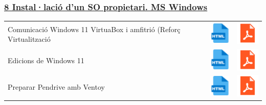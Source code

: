 \documentclass[
  12 pt,
  a4paper,
]{article}
\begin{document}
\subsubsection{\texorpdfstring{\hyperref[U8]{8 Instal·lació d'un SO
propietari. MS
Windows}}{8 Instal·lació d'un SO propietari. MS Windows}}\label{installaciuxf3-dun-so-propietari.-ms-windows}

\begin{longtable}[]{@{}
  >{\raggedright\arraybackslash}p{}
  >{\raggedright\arraybackslash}p{}
  >{\raggedright\arraybackslash}p{}@{}}
\toprule\noalign{}
\endhead
\bottomrule\noalign{}
\endlastfoot
Comunicació Windows 11 VirtuaBox i amfitrió (Reforç Virtualització &
\href{U8-SISTEMA\%20PROPIETARI-WINDOWS\%2011/U8-Virtualització-Windows11.html}{\includegraphics{recursos/iconohtml.png}}
&
\href{U8-SISTEMA\%20PROPIETARI-WINDOWS\%2011/U8-Virtualització-Windows11.pdf}{\includegraphics{recursos/iconopdf.png}} \\
Edicions de Windows 11 &
\href{U8-SISTEMA\%20PROPIETARI-WINDOWS\%2011/U8-DistrosWindows11.html}{\includegraphics{recursos/iconohtml.png}}
&
\href{U8-SISTEMA\%20PROPIETARI-WINDOWS\%2011/U8-DistrosWindows11.pdf}{\includegraphics{recursos/iconopdf.png}} \\
Preparar Pendrive amb Ventoy &
\href{U8-SISTEMA\%20PROPIETARI-WINDOWS\%2011/U8-PrepararPendriveVentoy.html}{\includegraphics{recursos/iconohtml.png}}
&
\href{U8-SISTEMA\%20PROPIETARI-WINDOWS\%2011/U8-PrepararPendriveVentoy.pdf}{\includegraphics{recursos/iconopdf.png}} \\

\end{longtable}
\end{document}
